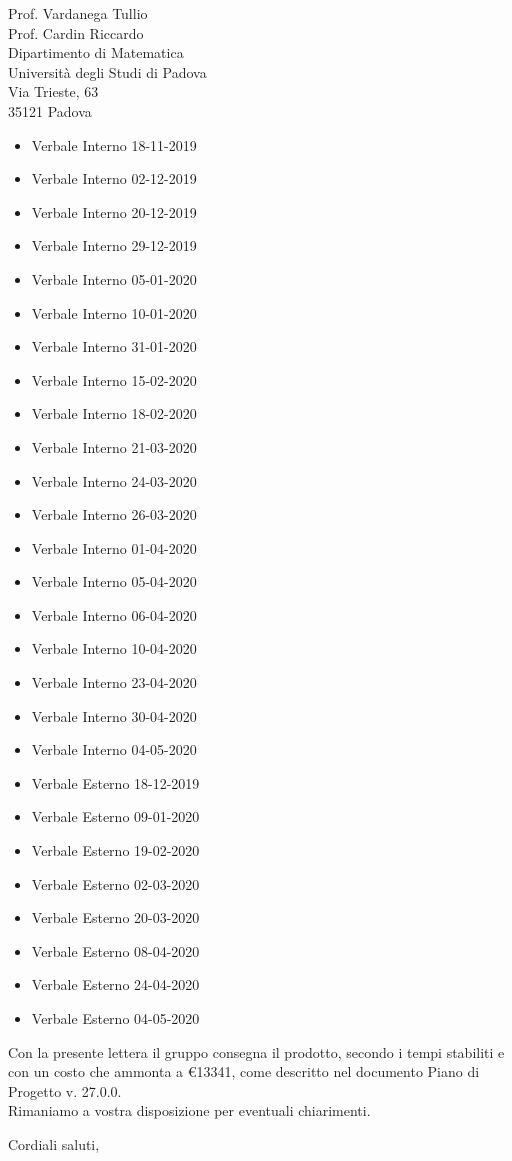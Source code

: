 \documentclass[a4paper,12pt]{letteracdp}
\begin{document}
\begin{letter}{
		Prof. Vardanega Tullio \\
		Prof. Cardin Riccardo \\
		Dipartimento di Matematica \\
		Università degli Studi di Padova \\
		Via Trieste, 63 \\
		35121 Padova}
\begin{itemize}
		\item Verbale Interno 18-11-2019
		\item Verbale Interno 02-12-2019
		\item Verbale Interno 20-12-2019
		\item Verbale Interno 29-12-2019
		\item Verbale Interno 05-01-2020
		\item Verbale Interno 10-01-2020
		\item Verbale Interno 31-01-2020
		\item Verbale Interno 15-02-2020
		\item Verbale Interno 18-02-2020
		\item Verbale Interno 21-03-2020 
		\item Verbale Interno 24-03-2020 
		\item Verbale Interno 26-03-2020 
		\item Verbale Interno 01-04-2020 
		\item Verbale Interno 05-04-2020 
		\item Verbale Interno 06-04-2020 
		\item Verbale Interno 10-04-2020
		\item Verbale Interno 23-04-2020
		\item Verbale Interno 30-04-2020
		\item Verbale Interno 04-05-2020
		
		\item Verbale Esterno 18-12-2019
		\item Verbale Esterno 09-01-2020
		\item Verbale Esterno 19-02-2020
		\item Verbale Esterno 02-03-2020
		\item Verbale Esterno 20-03-2020 
		\item Verbale Esterno 08-04-2020
		\item Verbale Esterno 24-04-2020
		\item Verbale Esterno 04-05-2020		
	\end{itemize}


	\begin{flushleft}
		\noindent Con la presente lettera il gruppo consegna il prodotto, secondo i tempi stabiliti e con un costo che ammonta a \euro{13341}, come descritto nel documento Piano di Progetto v. 27.0.0.
	\\
	
	Rimaniamo a vostra disposizione per eventuali chiarimenti.
	\end{flushleft}

	\closing{Cordiali saluti,}
	
\end{letter}	
\end{document}
